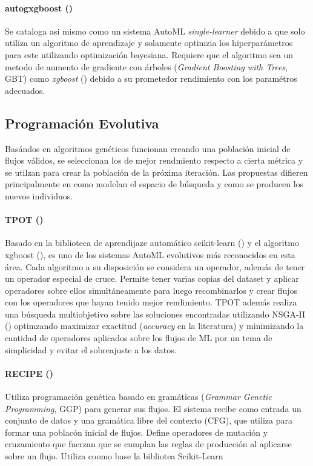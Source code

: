       \paragraph*{autogxgboost (\cite{thomas2018automatic})} Se cataloga asi mismo como un sistema AutoML \textit {single-learner} debido a que solo utiliza un algoritmo de aprendizaje y solamente optimzia los hiperpar\'ametros para este utilizando optimizaci\'on bayesiana. Requiere que el algoritmo sea un metodo de aumento de gradiente con \'arboles (\textit{Gradient Boosting with Trees}, GBT) como \textit {xgboost} (\cite{chen2016xgboost}) debido a su prometedor rendimiento con los param\'etros adecuados.   
    
\subsection{Programaci\'on Evolutiva}
     Bas\'andos en algoritmos gen\'eticos funcionan creando una poblaci\'on inicial de flujos v\'alidos, se seleccionan los de mejor rendmiento respecto a cierta m\'etrica y se utilzan para crear la poblaci\'on de la pr\'oxima iteraci\'on. Las propuestas difieren principalmente en como modelan el espacio de b\'usqueda y como se producen los nuevos individuos.
     \paragraph*{TPOT (\cite{pmlr-v64-olson_tpot_2016})} Basado en la biblioteca de aprendijaze autom\'atico scikit-learn (\cite{pedregosa2011scikit}) y el algoritmo xgboost (\cite{chen2016xgboost}), es uno de los sistemas AutoML evolutivos m\'as reconocidos en esta \'area. Cada algoritmo a su disposici\'on se considera un operador, adem\'as de tener un operador especial de cruce. Permite tener varias copias del dataset y aplicar operadores sobre ellos simult\'aneamente para luego recombinarlos y crear flujos con los operadores que hayan tenido mejor rendimiento. TPOT adem\'as realiza una b\'usqueda multiobjetivo sobre las soluciones encontradas utilizando NSGA-II (\cite{deb2002fast}) optimzando maximizar exactitud (\textit{accuracy} en la literatura) y minimizando la cantidad de operadores aplicados sobre los flujos de ML por un tema de simplicidad y evitar el sobreajuste a los datos.

     \paragraph*{RECIPE (\cite{de2017recipe})} Utiliza programaci\'on gen\'etica basado en gram\'aticas (\textit{Grammar Genetic Programming}, GGP) para generar sus flujos. El sistema recibe como entrada un conjunto de datos y una gram\'atica libre del contexto (CFG), que utiliza para formar una poblac\'on inicial de flujos. Define operadores de mutaci\'on y cruzamiento que fuerzan que se cumplan las reglas de producci\'on al aplicarse sobre un flujo. Utiliza coomo base la bibliotea Scikit-Learn

